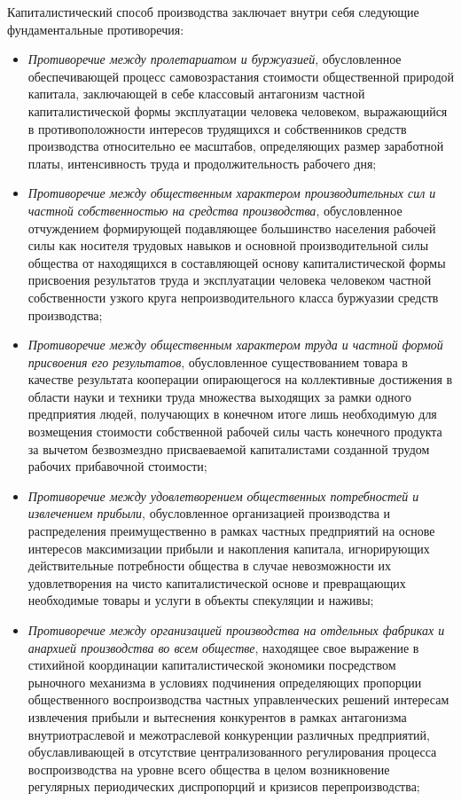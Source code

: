 Капиталистический способ производства заключает внутри себя следующие фундаментальные противоречия:
\begin{itemize}
    \item \textit{Противоречие между пролетариатом и буржуазией}, обусловленное обеспечивающей процесс самовозрастания стоимости общественной природой капитала, заключающей в себе классовый антагонизм частной капиталистической формы эксплуатации человека человеком, выражающийся в противоположности интересов трудящихся и собственников средств производства относительно ее масштабов, определяющих размер заработной платы, интенсивность труда и продолжительность рабочего дня;
    \item \textit{Противоречие между общественным характером производительных сил и частной собственностью на средства производства}, обусловленное отчуждением формирующей подавляющее большинство населения рабочей силы как носителя трудовых навыков и основной производительной силы общества от находящихся в составляющей основу капиталистической формы присвоения результатов труда и эксплуатации человека человеком частной собственности узкого круга непроизводительного класса буржуазии средств производства;
    \item \textit{Противоречие между общественным характером труда и частной формой присвоения его результатов}, обусловленное существованием товара в качестве результата кооперации опирающегося на коллективные достижения в области науки и техники труда множества выходящих за рамки одного предприятия людей, получающих в конечном итоге лишь необходимую для возмещения стоимости собственной рабочей силы часть конечного продукта за вычетом безвозмездно присваеваемой капиталистами созданной трудом рабочих прибавочной стоимости;
    \item \textit{Противоречие между удовлетворением общественных потребностей и извлечением прибыли}, обусловленное организацией производства и распределения преимущественно в рамках частных предприятий на основе интересов максимизации прибыли и накопления капитала, игнорирующих действительные потребности общества в случае невозможности их удовлетворения на чисто капиталистической основе и превращающих необходимые товары и услуги в объекты спекуляции и наживы;
    \item \textit{Противоречие между организацией производства на отдельных фабриках и анархией производства во всем обществе}, находящее свое выражение в стихийной координации капиталистической экономики посредством рыночного механизма в условиях подчинения определяющих пропорции общественного воспроизводства частных управленческих решений интересам извлечения прибыли и вытеснения конкурентов в рамках антагонизма внутриотраслевой и межотраслевой конкуренции различных предприятий, обуславливающей в отсутствие централизованного регулирования процесса воспроизводства на уровне всего общества в целом возникновение регулярных периодических диспропорций и кризисов перепроизводства;

\end{itemize}
